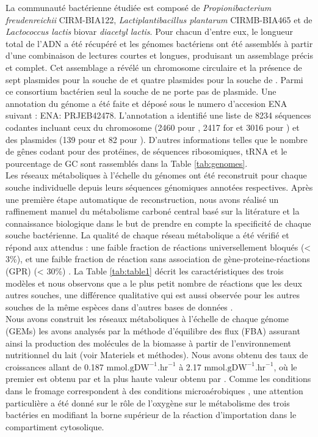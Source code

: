 \documentclass[../main.tex]{subfiles}
\begin{document}
La communauté bactérienne étudiée est composé de \textit{Propionibacterium freudenreichii} CIRM-BIA122, \textit{Lactiplantibacillus plantarum} CIRMB-BIA465 et de \textit{Lactococcus lactis} biovar \textit{diacetyl lactis}. Pour chacun d'entre eux, le longueur total de l'ADN a été récupéré et les génomes bactériens ont été assemblés à partir d'une combinaison de lectures courtes et longues, produisant un assemblage précis et complet. Cet assemblage a révélé un chromosome circulaire et la présence de sept plasmides pour la souche de \lactis et quatre plasmides pour la souche de \plantarum. Parmi ce consortium bactérien seul la souche de \freud ne porte pas de plasmide. Une annotation du génome a été faite et déposé sous le numero d'accesion ENA suivant : ENA: PRJEB42478. L'annotation a identifié une liste de 8234 séquences codantes incluant ceux du chromosome (2460 pour \freud, 2417 for \lactis et 3016 pour \plantarum) et des plasmides (139 pour \lactis et 82 pour \plantarum). D'autres informations telles que le nombre de gênes codant pour des protéines, de séquences ribosomiques, tRNA et le pourcentage de GC sont rassemblés dans la Table \ref{tab:genomes}.\\

Les réseaux métaboliques à l'échelle du génomes ont été reconstruit pour chaque souche individuelle depuis leurs séquences génomiques annotées respectives. Après une première étape automatique de reconstruction, nous avons réalisé un raffinement manuel du métabolisme carboné central basé sur la litérature et la connaissance biologique dans le but de prendre en compte la specificité de chaque souche bactérienne. La qualité de chaque réseau métabolique a été vérifié et répond aux attendus : une faible fraction de réactions universellement bloqués (< 3\%), et une faible fraction de réaction sans association de gène-proteine-réactions (GPR) (< 30\%) \citep{Lieven.2020}. La Table \ref{tab:table1} décrit les caractéristiques des trois modèles et nous observons que \lactis a le plus petit nombre de réactions que les deux autres souches, une différence qualitative qui est aussi observée pour les autres souches de la même espèces dans d'autres bases de données \citep{Noronha.2018}.\\

Nous avons construit les réseaux métaboliques à l'échelle de chaque génome (GEMs) les avons analysés par la méthode d'équilibre des flux (FBA) \citep{Palsson1994,Orth2010} assurant ainsi la production des molécules de la biomasse à partir de l'environnement nutritionnel du lait (voir Materiels et méthodes). Nous avons obtenu des taux de croissances allant de 0.187 $\text{mmol.gDW}^{-1}\text{.hr}^{-1}$ à 2.17 $\text{mmol.gDW}^{-1}\text{.hr}^{-1}$, où le premier est obtenu par \freud et la plus haute valeur obtenu par \lactis. Comme les conditions dans le fromage correspondent à des conditions microaérobiques \citep{Miyoshi2003}, une attention particulière a été donné sur le rôle de l'oxygène sur le métabolisme des trois bactéries en modifiant la borne supérieur de la réaction d'importation dans le compartiment cytosolique.
\end{document}
